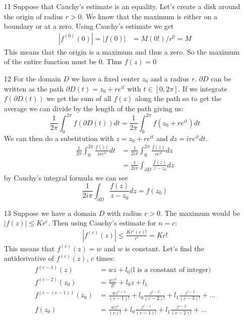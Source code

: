 \documentclass{article}
\begin{document}
  \begin{enumerate}
    \item[11]
      Suppose that Cauchy's estimate is an equality. Let's create a disk around the origin of radius $r>0$. We know that the maximum is either on a boundary or at a zero. Using Cauchy's estimate we get
      \begin{align*}
        |f^{(0)}(0)|=|f(0)|&=M(0!)/r^0=M
      \end{align*}
      This means that the origin is a maximum and thus a zero. So the maximum of the entire function must be 0. Thus $f(z)=0$
    \item[12]
      For the domain $D$ we have a fixed center $z_0$ and a radius $r$. $\partial D$ can be written as the path $\partial D(t)=z_0+re^{it}$ with $t\in[0,2\pi]$. If we integrate $f(\partial D(t))$ we get the sum of all $f(z)$ along the path so to get the average we can divide by the length of the path giving us:
      \[
        \frac{1}{2\pi}\int_0^{2\pi}f(\partial D(t))dt=\frac{1}{2\pi}\int_0^{2\pi}f(z_0+re^{it})dt
      \]
      We can then do a substitution with $z=z_0+re^{it}$ and $dz=ire^{it}dt$.
      \begin{align*}
        \frac{1}{2\pi}\int_0^{2\pi}\frac{f(z)}{ire^{it}}dt&=\frac{1}{2i\pi}\int_0^{2\pi}\frac{f(z)}{re^{it}}dz\\
        &=\frac{1}{2i\pi}\int_{\partial D}\frac{f(z)}{z-z_0}dz
      \end{align*}
      by Cauchy's integral formula we can see
      \[\frac{1}{2i\pi}\int_{\partial D}\frac{f(z)}{z-z_0}dz=f(z_0)\]
    \item[13]
      Suppose we have a domain $D$ with radius $r>0$. The maximum would be $|f(z)|\leq Kr^c$. Then using Cauchy's estimate for $n=c$:
      \begin{align*}
        |f^{(c)}(z)|\leq\frac{Kr^c(c)!}{r^c}=Kc!
      \end{align*}
      This means that $f^{(c)}(z)=w$ and $w$ is constant. Let's find the antiderivative of $f^{(c)}(z)$, $c$ times:
      \begin{align*}
        f^{(c-1)}(z)&=wz+l_0\text{(l is a constant of integer)}\\
        f^{(c-2)}(z_0)&=\frac{wz^2}{2!}+l_0z+l_1\\
        f^{(c-(c-1))}(z_0)&=\frac{wz^{c-1}}{(c-1)!}+l_0\frac{z^{c-2}}{(c-2)!}+l_1\frac{z^{c-3}}{(c-3)!}+...\\
        f(z_0)&=\frac{wz^{c}}{(c)!}+l_0\frac{z^{c-1}}{(c-1)!}+l_1\frac{z^{c-2}}{(c-2)!}+...
      \end{align*}

\end{enumerate}
\end{document}

